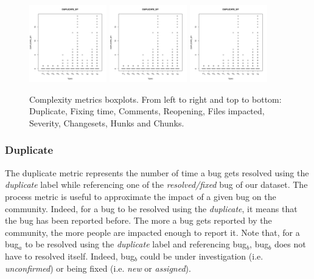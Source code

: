 \begin{figure}
\includegraphics[page=7, width=0.30\textwidth]{extract/Rplots}
\includegraphics[page=8, width=0.30\textwidth]{extract/Rplots}
\includegraphics[page=9, width=0.30\textwidth]{extract/Rplots}

\caption{Complexity metrics boxplots. From left to right and top to bottom: Duplicate, Fixing time, Comments, Reopening, Files impacted, Severity, Changesets, Hunks and Chunks.
\label{fig:boxplots}}

\end{figure}


\subsubsection{Duplicate}
The duplicate metric represents the number of time a bug gets resolved using the {\it duplicate} label while referencing one of the {\it resolved/fixed} bug of our dataset.
The process metric is useful to approximate the impact of a given bug on the community.
Indeed, for a bug to be resolved using the {\it duplicate}, it means that the bug has been reported before.
The more a bug gets reported by the community, the more people are impacted enough to report it.
Note that, for a bug$_a$ to be resolved using the {\it duplicate} label and referencing bug$_b$, bug$_b$ does not have to resolved itself.
Indeed, bug$_b$ could be under investigation (i.e. {\it unconfirmed}) or being fixed (i.e. {\it new} or {\it assigned}).

